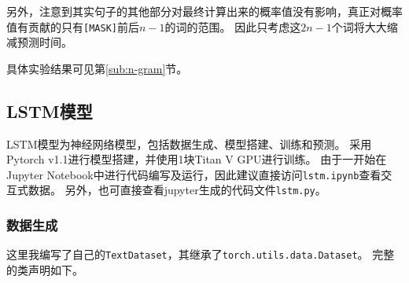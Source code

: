\documentclass[logo,reportComp]{thesis}
\begin{document}
另外，注意到其实句子的其他部分对最终计算出来的概率值没有影响，真正对概率值有贡献的只有\verb'[MASK]'前后$n-1$的词的范围。
因此只考虑这$2n-1$个词将大大缩减预测时间。

具体实验结果可见第\ref{sub:n-gram}节。

\subsection{LSTM模型}
LSTM模型为神经网络模型，包括数据生成、模型搭建、训练和预测。
采用Pytorch v1.1进行模型搭建，并使用1块Titan V GPU进行训练。
由于一开始在Jupyter Notebook中进行代码编写及运行，因此建议直接访问\verb'lstm.ipynb'查看交互式数据。
另外，也可直接查看jupyter生成的代码文件\verb'lstm.py'。

\subsubsection{数据生成}
这里我编写了自己的\verb'TextDataset'，其继承了\verb'torch.utils.data.Dataset'。
完整的类声明如下。
\end{document}
